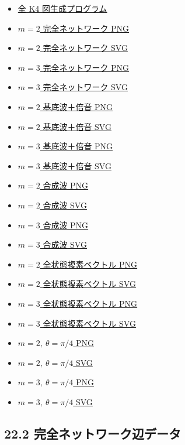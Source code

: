 \documentclass[
  a4paper,
]{ltjsarticle}
\providecommand{\tightlist}{%
  \setlength{\itemsep}{0pt}\setlength{\parskip}{0pt}}
\begin{document}
\begin{itemize}
\tightlist
\item
  \href{generate_all_K4_harmonic_figures_20260915.py}{全 K4
  図生成プログラム}
\item
  \href{figs/K4_complete_network_m2.png}{\(m=2\) 完全ネットワーク PNG}
\item
  \href{K4_complete_network_m2.svg}{\(m=2\) 完全ネットワーク SVG}
\item
  \href{figs/K4_complete_network_m3.png}{\(m=3\) 完全ネットワーク PNG}
\item
  \href{K4_complete_network_m3.svg}{\(m=3\) 完全ネットワーク SVG}
\item
  \href{figs/waves_base_harmonic_m2.png}{\(m=2\) 基底波＋倍音 PNG}
\item
  \href{waves_base_harmonic_m2.svg}{\(m=2\) 基底波＋倍音 SVG}
\item
  \href{figs/waves_base_harmonic_m3.png}{\(m=3\) 基底波＋倍音 PNG}
\item
  \href{waves_base_harmonic_m3.svg}{\(m=3\) 基底波＋倍音 SVG}
\item
  \href{figs/composite_wave_m2.png}{\(m=2\) 合成波 PNG}
\item
  \href{composite_wave_m2.svg}{\(m=2\) 合成波 SVG}
\item
  \href{figs/composite_wave_m3.png}{\(m=3\) 合成波 PNG}
\item
  \href{composite_wave_m3.svg}{\(m=3\) 合成波 SVG}
\item
  \href{figs/complex_vectors_all_states_m2.png}{\(m=2\)
  全状態複素ベクトル PNG}
\item
  \href{complex_vectors_all_states_m2.svg}{\(m=2\) 全状態複素ベクトル
  SVG}
\item
  \href{figs/complex_vectors_all_states_m3.png}{\(m=3\)
  全状態複素ベクトル PNG}
\item
  \href{complex_vectors_all_states_m3.svg}{\(m=3\) 全状態複素ベクトル
  SVG}
\item
  \href{figs/complex_vectors_theta_pi4_m2.png}{\(m=2,\ \theta=\pi/4\)
  PNG}
\item
  \href{complex_vectors_theta_pi4_m2.svg}{\(m=2,\ \theta=\pi/4\) SVG}
\item
  \href{figs/complex_vectors_theta_pi4_m3.png}{\(m=3,\ \theta=\pi/4\)
  PNG}
\item
  \href{complex_vectors_theta_pi4_m3.svg}{\(m=3,\ \theta=\pi/4\) SVG}
\end{itemize}

\subsection{22.2
完全ネットワーク辺データ}\label{ux5b8cux5168ux30cdux30c3ux30c8ux30efux30fcux30afux8fbaux30c7ux30fcux30bf}
\end{document}
